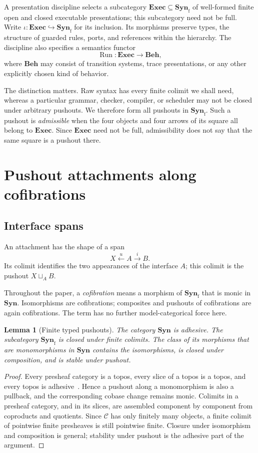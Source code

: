 \documentclass[11pt]{article}
\newtheorem{lemma}[theorem]{Lemma}
\newcommand{\Syn}{\mathbf{Syn}}
\newcommand{\Exec}{\mathbf{Exec}}
\newcommand{\Beh}{\mathbf{Beh}}
\DeclareMathOperator{\Run}{Run}
\begin{document}
A presentation discipline selects a subcategory
\(\Exec\subseteq\Syn_{\mathrm f}\) of well-formed finite open and closed
executable presentations; this subcategory need not be full.  Write
\(\iota:\Exec\hookrightarrow\Syn_{\mathrm f}\)
for its inclusion.
Its morphisms preserve types, the structure of guarded rules, ports, and
references within the hierarchy.  The discipline also specifies a semantics
functor
\[
 \Run:\Exec\longrightarrow\Beh,
\]
where \(\Beh\) may consist of transition systems, trace presentations, or any
other explicitly chosen kind of behavior.

The distinction matters.  Raw syntax has every finite colimit we shall need,
whereas a particular grammar, checker, compiler, or scheduler may not be
closed under arbitrary pushouts.  We therefore form all pushouts in
\(\Syn_{\mathrm f}\).  Such a pushout is \emph{admissible} when the four
objects and four arrows of its square all belong to \(\Exec\).  Since
\(\Exec\) need not be full, admissibility does not say that the same square is
a pushout there.

\section{Pushout attachments along cofibrations}

\subsection{Interface spans}

An attachment has the shape of a span
\[
 X\xleftarrow{u}A\xrightarrow{i}B.
\]
Its colimit identifies the two appearances of the interface \(A\); this
colimit is the pushout \(X\sqcup_A B\).

Throughout the paper, a \emph{cofibration} means a morphism of
\(\Syn_{\mathrm f}\) that is monic in \(\Syn\).  Isomorphisms are
cofibrations; composites and pushouts of cofibrations are again cofibrations.
The term has no further model-categorical force here.

\begin{lemma}[Finite typed pushouts]\label{lem:typed-pushouts}
The category \(\Syn\) is adhesive.  The subcategory \(\Syn_{\mathrm f}\) is
closed under finite colimits.  The class of its morphisms that are
monomorphisms in \(\Syn\) contains the isomorphisms, is closed under
composition, and is stable under pushout.
\end{lemma}

\begin{proof}
Every presheaf category is a topos, every slice of a topos is a topos, and
every topos is adhesive~\cite{lack,toposes}.  Hence a pushout along a
monomorphism is also a pullback, and the corresponding cobase change remains
monic.  Colimits in a presheaf category, and in its slices, are assembled
component by component from coproducts and quotients.  Since \(\mathcal C\)
has only finitely many objects, a finite colimit of pointwise finite
presheaves is still pointwise finite.  Closure under isomorphism and
composition is general; stability under pushout is the adhesive part of the
argument.
\end{proof}
\end{document}
